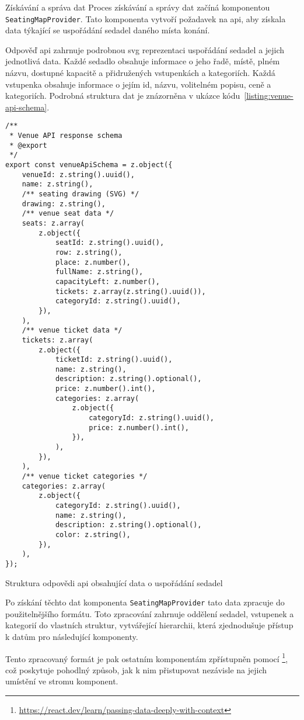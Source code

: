 \begin{subsection}{Získávání a správa dat}
    \label{subsec:implementace-seating-data}
    Proces získávání a správy dat začíná komponentou \texttt{SeatingMapProvider}.
    Tato komponenta vytvoří požadavek na \ac{api}, aby získala data týkající se uspořádání sedadel daného místa konání.

    Odpověď \ac{api} zahrnuje podrobnou \ac{svg} reprezentaci uspořádání sedadel a jejich jednotlivá data.
    Každé sedadlo obsahuje informace o jeho řadě, místě, plném názvu, dostupné kapacitě a přidružených vstupenkách a kategoriích.
    Každá vstupenka obsahuje informace o jejím id, názvu, volitelném popisu, ceně a kategoriích.
    Podrobná struktura dat je znázorněna v ukázce kódu~\ref{listing:venue-api-schema}.

    \begin{listing}[H]
        \begin{verbatim}
/**
 * Venue API response schema
 * @export
 */
export const venueApiSchema = z.object({
	venueId: z.string().uuid(),
	name: z.string(),
	/** seating drawing (SVG) */
	drawing: z.string(),
	/** venue seat data */
	seats: z.array(
		z.object({
			seatId: z.string().uuid(),
			row: z.string(),
			place: z.number(),
			fullName: z.string(),
			capacityLeft: z.number(),
			tickets: z.array(z.string().uuid()),
			categoryId: z.string().uuid(),
		}),
	),
	/** venue ticket data */
	tickets: z.array(
		z.object({
			ticketId: z.string().uuid(),
			name: z.string(),
			description: z.string().optional(),
			price: z.number().int(),
			categories: z.array(
				z.object({
					categoryId: z.string().uuid(),
					price: z.number().int(),
				}),
			),
		}),
	),
	/** venue ticket categories */
	categories: z.array(
		z.object({
			categoryId: z.string().uuid(),
			name: z.string(),
			description: z.string().optional(),
			color: z.string(),
		}),
	),
});
        \end{verbatim}
        \caption{Struktura odpovědi \ac{api} obsahující data o uspořádání sedadel}
        \label{listing:venue-api-schema}
    \end{listing}

    Po získání těchto dat komponenta \texttt{SeatingMapProvider} tato data zpracuje do použitelnějšího formátu.
    Toto zpracování zahrnuje oddělení sedadel, vstupenek a kategorií do vlastních struktur, vytvářející hierarchii, která zjednodušuje přístup k datům pro následující komponenty.

    Tento zpracovaný formát je pak ostatním komponentám zpřístupněn pomocí \footnote{\url{https://react.dev/learn/passing-data-deeply-with-context}}, což poskytuje pohodlný způsob, jak k nim přistupovat nezávisle na jejich umístění ve stromu komponent.
\end{subsection}

